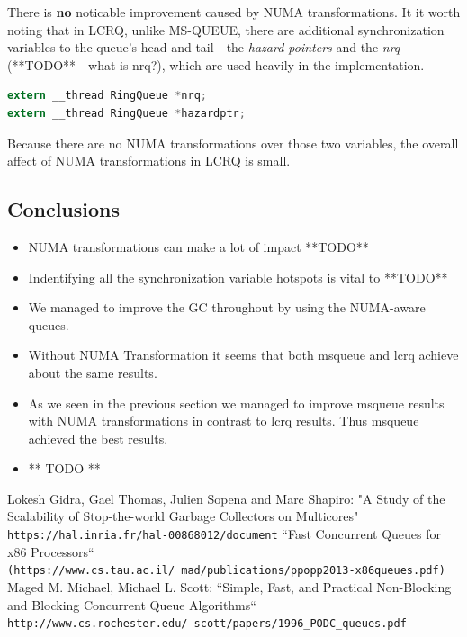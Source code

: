 \documentclass{article}
\begin{document}
 There is \textbf{no} noticable improvement caused by NUMA transformations. It it worth noting that in LCRQ, unlike MS-QUEUE, there are additional synchronization variables to the queue's head and tail - the \textit{hazard pointers} and the \textit{nrq} (**TODO** - what is nrq?), which are used heavily in the implementation.

 \begin{lstlisting}[language=C]
extern __thread RingQueue *nrq;
extern __thread RingQueue *hazardptr;
 \end{lstlisting}

 Because there are no NUMA transformations over those two variables, the overall affect of NUMA transformations in LCRQ is small.

 \subsection{Conclusions}

 \begin{itemize}
   \item NUMA transformations can make a lot of impact **TODO**
   \item Indentifying all the synchronization variable hotspots is vital to **TODO**
   \item We managed to improve the GC throughout by using the NUMA-aware queues.
   \item Without NUMA Transformation it seems that both msqueue and lcrq achieve about the same results.
   \item As we seen in the previous section we managed to improve msqueue results with NUMA transformations in contrast to lcrq results. Thus msqueue achieved the best results.
   \item ** TODO **
 \end{itemize}

  \medskip
  \newpage

  \begin{thebibliography}{9}
      Lokesh Gidra, Gael Thomas, Julien Sopena and Marc Shapiro: "A Study of the Scalability of Stop-the-world Garbage Collectors on Multicores"
      \\\texttt{https://hal.inria.fr/hal-00868012/document}
      ``Fast Concurrent Queues for x86 Processors``
      \\\texttt{(https://www.cs.tau.ac.il/~mad/publications/ppopp2013-x86queues.pdf)}
	    Maged M. Michael, Michael L. Scott: ``Simple, Fast, and Practical Non-Blocking and Blocking Concurrent Queue Algorithms``
      \\\texttt{http://www.cs.rochester.edu/~scott/papers/1996\_PODC\_queues.pdf}
  \end{thebibliography}
\end{document}
